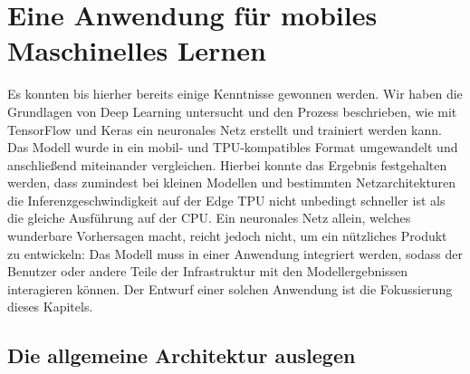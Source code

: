 \chapter{Eine Anwendung für mobiles Maschinelles Lernen}
\label{chap:application}
Es konnten bis hierher bereits einige Kenntnisse gewonnen
werden. Wir haben die Grundlagen von Deep Learning untersucht
und den Prozess beschrieben, wie mit TensorFlow und Keras
ein neuronales Netz erstellt und trainiert werden kann.
Das Modell wurde in ein mobil- und TPU-kompatibles Format umgewandelt
und anschließend miteinander vergleichen.
Hierbei konnte das Ergebnis festgehalten werden,
dass zumindest bei kleinen Modellen und bestimmten Netzarchitekturen
die Inferenzgeschwindigkeit
auf der Edge TPU nicht unbedingt schneller ist als die gleiche
Ausführung auf der CPU.
Ein neuronales Netz allein, welches wunderbare Vorhersagen
macht, reicht jedoch nicht, um ein nützliches Produkt zu entwickeln:
Das Modell muss in einer Anwendung integriert werden, sodass
der Benutzer oder andere Teile der Infrastruktur
mit den Modellergebnissen interagieren können.
Der Entwurf einer solchen Anwendung ist die
Fokussierung dieses Kapitels.

\section{Die allgemeine Architektur auslegen}